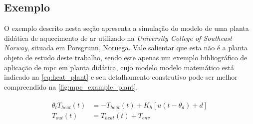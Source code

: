 
\subsection{Exemplo}
\label{subsec:mpc_example}

O exemplo descrito nesta seção apresenta a simulação do modelo de uma planta didática de aquecimento de ar
utilizado na \textit{University College of Southeast Norway}, situada em Porsgrunn, Noruega.
Vale salientar que esta não é a planta objeto de estudo deste trabalho, sendo este apenas um exemplo
bibliográfico de aplicação de \acrshort{mpc} em planta didática, cujo modelo modelo matemático está indicado na
\cref{eq:heat_plant} e seu detalhamento construtivo pode ser melhor compreendido na \cref{fig:mpc_example_plant}.

\begin{subequations}
    \label{eq:heat_plant}
    \begin{align}
        {\theta}_t \dot{T}_{heat} (t) &= -T_{heat} (t) + K_h [u(t - {\theta}_d) + d]     \\
        T_{out} (t) &= T_{heat} (t) + T_{env}
    \end{align}
\end{subequations}

